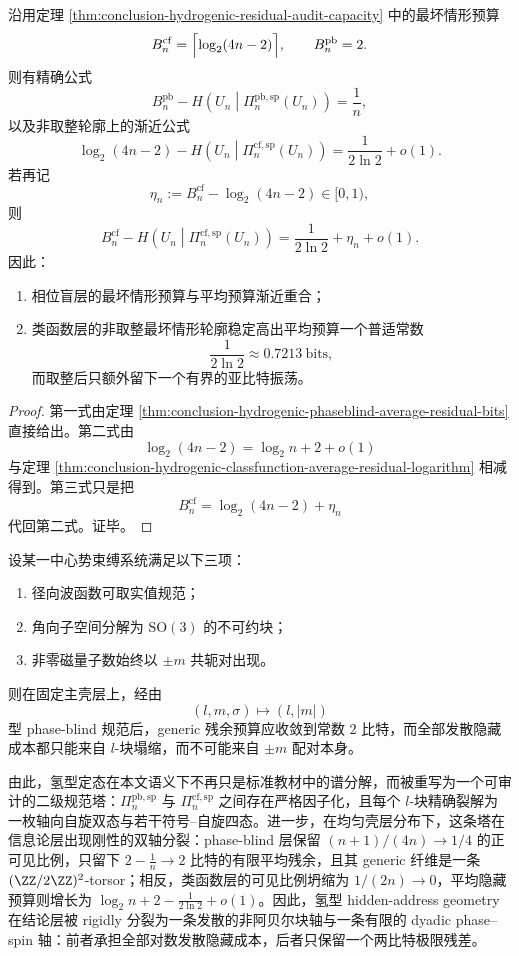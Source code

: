 \begin{proposition}[最坏情形预算与平均预算的匹配差异]\label{prop:conclusion-hydrogenic-worst-average-budget-gap}
沿用定理 \ref{thm:conclusion-hydrogenic-residual-audit-capacity} 中的最坏情形预算
\[
B_n^{\mathrm{cf}}=\Bigl\lceil \log_2(4n-2)\Bigr\rceil,
\qquad
B_n^{\mathrm{pb}}=2.
\]
则有精确公式
\[
B_n^{\mathrm{pb}}
-
H\!\left(U_n\middle|\Pi_n^{\mathrm{pb,sp}}(U_n)\right)
=
\frac1n,
\]
以及非取整轮廓上的渐近公式
\[
\log_2(4n-2)
-
H\!\left(U_n\middle|\Pi_n^{\mathrm{cf,sp}}(U_n)\right)
=
\frac{1}{2\ln2}+o(1).
\]
若再记
\[
\eta_n:=B_n^{\mathrm{cf}}-\log_2(4n-2)\in[0,1),
\]
则
\[
B_n^{\mathrm{cf}}
-
H\!\left(U_n\middle|\Pi_n^{\mathrm{cf,sp}}(U_n)\right)
=
\frac{1}{2\ln2}+\eta_n+o(1).
\]
因此：
\begin{enumerate}
  \item 相位盲层的最坏情形预算与平均预算渐近重合；
  \item 类函数层的非取整最坏情形轮廓稳定高出平均预算一个普适常数
  \[
  \frac{1}{2\ln2}\approx 0.7213\ \text{bits},
  \]
  而取整后只额外留下一个有界的亚比特振荡。
\end{enumerate}
\end{proposition}
\begin{proof}
第一式由定理 \ref{thm:conclusion-hydrogenic-phaseblind-average-residual-bits} 直接给出。第二式由
\[
\log_2(4n-2)=\log_2 n+2+o(1)
\]
与定理 \ref{thm:conclusion-hydrogenic-classfunction-average-residual-logarithm} 相减得到。第三式只是把
\[
B_n^{\mathrm{cf}}=\log_2(4n-2)+\eta_n
\]
代回第二式。证毕。
\end{proof}

\begin{conjecture}\label{conj:conclusion-central-potential-two-bit-phaseblind-law}
设某一中心势束缚系统满足以下三项：
\begin{enumerate}
  \item 径向波函数可取实值规范；
  \item 角向子空间分解为 \(\mathrm{SO}(3)\) 的不可约块；
  \item 非零磁量子数始终以 \(\pm m\) 共轭对出现。
\end{enumerate}
则在固定主壳层上，经由
\[
(l,m,\sigma)\longmapsto (l,|m|)
\]
型 phase-blind 规范后，generic 残余预算应收敛到常数 \(2\) 比特，而全部发散隐藏成本都只能来自 \(l\)-块塌缩，而不可能来自 \(\pm m\) 配对本身。
\end{conjecture}

\noindent
由此，氢型定态在本文语义下不再只是标准教材中的谱分解，而被重写为一个可审计的二级规范塔：\(\Pi_n^{\mathrm{pb,sp}}\) 与 \(\Pi_n^{\mathrm{cf,sp}}\) 之间存在严格因子化，且每个 \(l\)-块精确裂解为一枚轴向自旋双态与若干符号--自旋四态。进一步，在均匀壳层分布下，这条塔在信息论层出现刚性的双轴分裂：phase-blind 层保留 \((n+1)/(4n)\to 1/4\) 的正可见比例，只留下 \(2-\tfrac1n\to 2\) 比特的有限平均残余，且其 generic 纤维是一条 \((\ZZ/2\ZZ)^2\)-torsor；相反，类函数层的可见比例坍缩为 \(1/(2n)\to 0\)，平均隐藏预算则增长为 \(\log_2 n+2-\frac{1}{2\ln2}+o(1)\)。因此，氢型 hidden-address geometry 在结论层被 rigidly 分裂为一条发散的非阿贝尔块轴与一条有限的 dyadic phase--spin 轴：前者承担全部对数发散隐藏成本，后者只保留一个两比特极限残差。

\endinput
